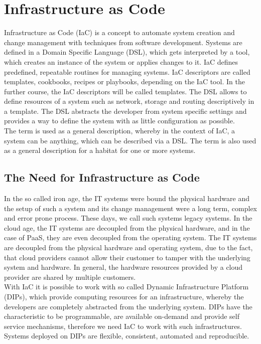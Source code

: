 \chapter{Infrastructure as Code}
\label{cha:iac}
Infrastructure as Code (IaC) is a concept to automate system creation and change management with techniques from software development. Systems are defined in a Domain Specific Language (DSL), which gets interpreted by a tool, which creates an instance of the system or applies changes to it. IaC defines predefined, repeatable routines for managing systems. IaC descriptors are called templates, cookbooks, recipes or playbooks, depending on the IaC tool. In the further course, the IaC descriptors will be called templates. The DSL allows to define resources of a system such as network, storage and routing descriptively in a template. The DSL abstracts the developer from system specific settings and provides a way to define the system with as little configuration as possible\cite{Morris2016}. \\

The term  is used as a general description, whereby in the context of IaC, a system can be anything, which can be described via a DSL. The term  is also used as a general description for a habitat for one or more systems.  

\section{The Need for Infrastructure as Code}
\label{sec:iac-need}
In the so called iron age, the IT systems were bound the physical hardware and the setup of such a system and its change management were a long term, complex and error prone process. These days, we call such systems legacy systems. In the cloud age, the IT systems are decoupled from the physical hardware, and in the case of PaaS, they are even decoupled from the operating system. The IT systems are decoupled from the physical hardware and operating system, due to the fact, that cloud providers cannot allow their customer to tamper with the underlying system and hardware. In general, the hardware resources provided by a cloud provider are shared by multiple customers\cite{Morris2016}. \\

With IaC it is possible to work with so called Dynamic Infrastructure Platform (DIPs), which provide computing resources for an infrastructure, whereby the developers are completely abstracted from the underlying system. DIPs have the characteristic to be programmable, are available on-demand and provide self service mechanisms, therefore we need IaC to work with such infrastructures. Systems deployed on DIPs are flexible, consistent, automated and reproducible\cite{Morris2016}. \\

